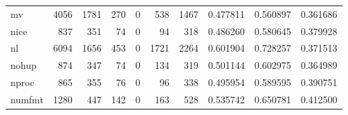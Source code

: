 \begin{tabular}{lrrrrrrrrr}
mv        &                                4056 &                                            1781 &                                            270 &                                             0 &                                            538 &                                         1467 &                                           0.477811 &                               0.560897 &                             0.361686 \\
nice      &                                 837 &                                             351 &                                             74 &                                             0 &                                             94 &                                          318 &                                           0.486260 &                               0.580645 &                             0.379928 \\
nl        &                                6094 &                                            1656 &                                            453 &                                             0 &                                           1721 &                                         2264 &                                           0.601904 &                               0.728257 &                             0.371513 \\
nohup     &                                 874 &                                             347 &                                             74 &                                             0 &                                            134 &                                          319 &                                           0.501144 &                               0.602975 &                             0.364989 \\
nproc     &                                 865 &                                             355 &                                             76 &                                             0 &                                             96 &                                          338 &                                           0.495954 &                               0.589595 &                             0.390751 \\
numfmt    &                                1280 &                                             447 &                                            142 &                                             0 &                                            163 &                                          528 &                                           0.535742 &                               0.650781 &                             0.412500 \\

\end{tabular}
